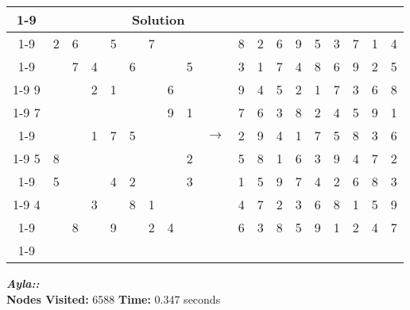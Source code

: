 \documentclass{article}
\begin{document}
\begin{tabular}{||c|c|c||c|c|c||c|c|c|| c ||c|c|c||c|c|c||c|c|c||}
  \cmidrule{1-9} \cmidrule{11-19}
  \multicolumn{9}{|c|}{Problem} &                   & \multicolumn{9}{|c|}{Solution}   \\\cmidrule{1-9} \cmidrule{11-19} \morecmidrules \cmidrule{1-9} \cmidrule{11-19}
   & 2 & 6 &   & 5 &   & 7 &   &   &               & 8 & 2 & 6 & 9 & 5 & 3 & 7 & 1 & 4\\\cmidrule{1-9} \cmidrule{11-19}
   &   & 7 & 4 &   & 6 &   &   & 5 &               & 3 & 1 & 7 & 4 & 8 & 6 & 9 & 2 & 5\\\cmidrule{1-9} \cmidrule{11-19}
 9 &   &   & 2 & 1 &   &   & 6 &   &               & 9 & 4 & 5 & 2 & 1 & 7 & 3 & 6 & 8\\\cmidrule{1-9} \cmidrule{11-19} \morecmidrules \cmidrule{1-9} \cmidrule{11-19}
 7 &   &   &   &   &   &   & 9 & 1 &               & 7 & 6 & 3 & 8 & 2 & 4 & 5 & 9 & 1\\\cmidrule{1-9} \cmidrule{11-19}
   &   &   & 1 & 7 & 5 &   &   &   & $\rightarrow$ & 2 & 9 & 4 & 1 & 7 & 5 & 8 & 3 & 6\\\cmidrule{1-9} \cmidrule{11-19}
 5 & 8 &   &   &   &   &   &   & 2 &               & 5 & 8 & 1 & 6 & 3 & 9 & 4 & 7 & 2\\\cmidrule{1-9} \cmidrule{11-19} \morecmidrules \cmidrule{1-9} \cmidrule{11-19}
   & 5 &   &   & 4 & 2 &   &   & 3 &               & 1 & 5 & 9 & 7 & 4 & 2 & 6 & 8 & 3\\\cmidrule{1-9} \cmidrule{11-19}
 4 &   &   & 3 &   & 8 & 1 &   &   &               & 4 & 7 & 2 & 3 & 6 & 8 & 1 & 5 & 9\\\cmidrule{1-9} \cmidrule{11-19}
   &   & 8 &   & 9 &   & 2 & 4 &   &               & 6 & 3 & 8 & 5 & 9 & 1 & 2 & 4 & 7\\\cmidrule{1-9} \cmidrule{11-19} \morecmidrules \cmidrule{1-9} \cmidrule{11-19}
\end{tabular}
\newpage
\small\emph{\textbf{Ayla::}}\\ \textbf{Nodes Visited:} 6588 \textbf{Time:} 0.347 seconds\\
\end{document}

